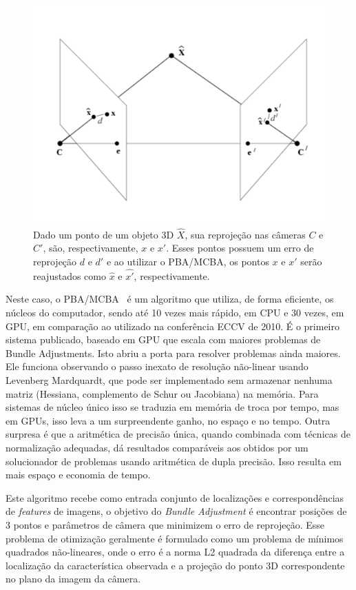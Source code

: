 \begin{itemize}
\begin{figure}[!h]
	\centering
	\includegraphics[width=0.5\linewidth]{figs/bundleAdjustment.png}
	\caption{
	Dado um ponto de um objeto 3D $\widehat{X}$, sua reprojeção nas câmeras $C$ e $C'$, são, respectivamente, $x$ e $x'$. Esses pontos possuem um erro de reprojeção $d$ e $d'$ e ao utilizar o PBA/MCBA, os pontos $x$ e $x'$ serão reajustados como $\widehat{x}$ e $\widehat{x'}$, respectivamente. 
	\protect\cite{3DCompVision2Didier}
	}\label{fig:bundleAdjustment}
\end{figure}

Neste caso, o PBA/MCBA~\cite{furukawa2009accurate,wu2011multicore} é um algoritmo que utiliza, de forma eficiente, os núcleos do computador, sendo até 10 vezes mais rápido, em CPU e 30 vezes, em GPU, em comparação ao utilizado na conferência ECCV de 2010. É o primeiro sistema publicado, baseado em GPU que escala com maiores problemas de Bundle Adjustments. Isto abriu a porta para resolver problemas ainda maiores. Ele funciona observando o passo inexato de resolução não-linear usando Levenberg Mardquardt, que pode ser implementado sem armazenar nenhuma matriz (Hessiana, complemento de Schur ou Jacobiana) na memória. Para sistemas de núcleo único isso se traduzia em memória de troca por tempo, mas em GPUs, isso leva a um surpreendente ganho, no espaço e no tempo. Outra surpresa é que a aritmética de precisão única, quando combinada com técnicas de normalização adequadas, dá resultados comparáveis aos obtidos por um solucionador de problemas usando aritmética de dupla precisão. Isso resulta em mais espaço e economia de tempo.

Este algoritmo recebe como entrada conjunto de localizações e correspondências de \emph{features} de imagens, o objetivo do \emph{Bundle Adjustment} é encontrar posições de 3 pontos e parâmetros de câmera que minimizem o erro de reprojeção. Esse problema de otimização geralmente é formulado como um problema de mínimos quadrados não-lineares, onde o erro é a norma L2 quadrada da diferença entre a localização da característica observada e a projeção do ponto 3D correspondente no plano da imagem da câmera.


\end{itemize}
